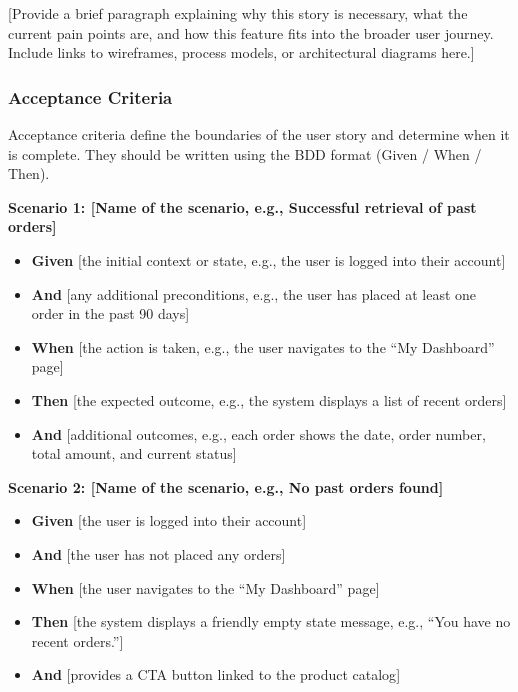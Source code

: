 \documentclass[
  11pt,
  openany,
  oneside]{book}
\providecommand{\tightlist}{%
  \setlength{\itemsep}{0pt}\setlength{\parskip}{0pt}}
\begin{document}
{[}Provide a brief paragraph explaining why this story is necessary,
what the current pain points are, and how this feature fits into the
broader user journey. Include links to wireframes, process models, or
architectural diagrams here.{]}

\subsubsection{Acceptance Criteria}\label{acceptance-criteria}

Acceptance criteria define the boundaries of the user story and
determine when it is complete. They should be written using the BDD
format (Given / When / Then).

\textbf{Scenario 1: {[}Name of the scenario, e.g., Successful retrieval
of past orders{]}}

\begin{itemize}
\tightlist
\item
  \textbf{Given} {[}the initial context or state, e.g., the user is
  logged into their account{]}
\item
  \textbf{And} {[}any additional preconditions, e.g., the user has
  placed at least one order in the past 90 days{]}
\item
  \textbf{When} {[}the action is taken, e.g., the user navigates to the
  ``My Dashboard'' page{]}
\item
  \textbf{Then} {[}the expected outcome, e.g., the system displays a
  list of recent orders{]}
\item
  \textbf{And} {[}additional outcomes, e.g., each order shows the date,
  order number, total amount, and current status{]}
\end{itemize}

\textbf{Scenario 2: {[}Name of the scenario, e.g., No past orders
found{]}}

\begin{itemize}
\tightlist
\item
  \textbf{Given} {[}the user is logged into their account{]}
\item
  \textbf{And} {[}the user has not placed any orders{]}
\item
  \textbf{When} {[}the user navigates to the ``My Dashboard'' page{]}
\item
  \textbf{Then} {[}the system displays a friendly empty state message,
  e.g., ``You have no recent orders.''{]}
\item
  \textbf{And} {[}provides a CTA button linked to the product catalog{]}
\end{itemize}
\end{document}
